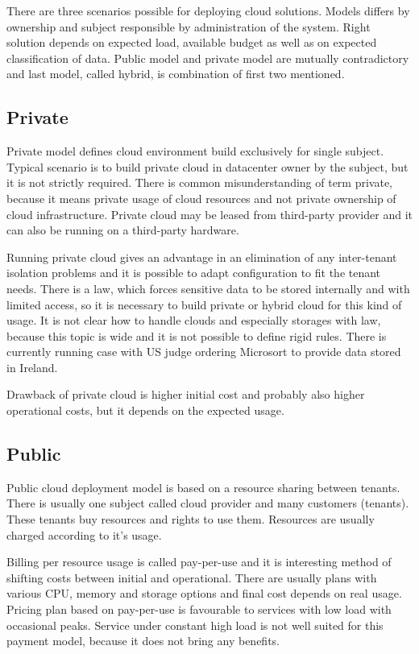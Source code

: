 
There are three scenarios possible for deploying cloud solutions. Models differs by ownership and subject responsible by administration of the system. Right solution depends on expected load, available budget as well as on expected classification of data. Public model and private model are mutually contradictory and last model, called hybrid, is combination of first two mentioned.

\subsection{Private}
Private model defines cloud environment build exclusively for single subject. Typical scenario is to build private cloud in datacenter owner by the subject, but it is not strictly required. There is common misunderstanding of term private, because it means private usage of cloud resources and not private ownership of cloud infrastructure. Private cloud may be leased from third-party provider and it can also be running on a third-party hardware.

Running private cloud gives an advantage in an elimination of any inter-tenant isolation problems and it is possible to adapt configuration to fit the tenant needs. There is a law, which forces sensitive data to be stored internally and with limited access, so it is necessary to build private or hybrid cloud for this kind of usage. It is not clear how to handle clouds and especially storages with law, because this topic is wide and it is not possible to define rigid rules. There is currently running case with \Ac{US} judge ordering Microsort to provide data stored in Ireland. \cite{wp-microsoft-ireland}

Drawback of private cloud is higher initial cost and probably also higher operational costs, but it depends on the expected usage.

\subsection{Public}
Public cloud deployment model is based on a resource sharing between tenants. There is usually one subject called cloud provider and many customers (tenants). These tenants buy resources and rights to use them. Resources are usually charged according to it's usage.

Billing per resource usage is called pay-per-use and it is interesting method of shifting costs between initial and operational. There are usually plans with various \Ac{CPU}, memory and storage options and final cost depends on real usage. Pricing plan based on pay-per-use is favourable to services with low load with occasional peaks. Service under constant high load is not well suited for this payment model, because it does not bring any benefits.

